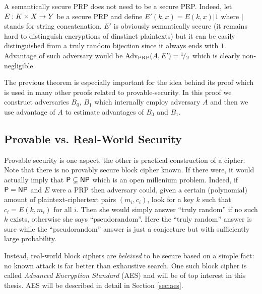 \begin{note}
	A semantically secure PRP does not need to be a secure PRP. Indeed, let $E: K\times X\rightarrow Y$ be a secure PRP and define $E'(k,x) = E(k,x)|1$ where $|$ stands for string concatenation. $E'$ is obviously semantically secure (it remains hard to distinguish encryptions of dinstinct plaintexts) but it can be easily distinguished from a truly random bijection since it always ends with $1$. Advantage of such adversary would be $\operatorname*{Adv_{PRP}}(A,E') = {}^{1}\!/_{2}$ which is clearly non-negligible.
\end{note}

The previous theorem is especially important for the idea behind its proof which is used in many other proofs related to provable-security. In this proof we construct adversaries $B_0$, $B_1$ which internally employ adversary $A$ and then we use advantage of $A$ to estimate advantages of $B_0$ and $B_1$.


\subsection{Provable vs. Real-World Security}

Provable security is one aspect, the other is practical construction of a cipher. Note that there is no provably secure block cipher known. If there were, it would actually imply that $\mathsf{P} \subsetneq \mathsf{NP}$ which is an open millenium problem. Indeed, if $\mathsf{P} = \mathsf{NP}$ and $E$ were a PRP then adversary could, given a certain (polynomial) amount of plaintext-ciphertext pairs $(m_i,c_i)$, look for a key $k$ such that $c_i = E(k,m_i)$ for all $i$. Then she would simply answer ``truly random'' if no such $k$ exists, otherwise she says ``pseudorandom''. Here the ``truly random'' answer is sure while the ``pseudorandom'' answer is just a conjecture but with sufficiently large probability.

Instead, real-world block ciphers are {\em beleived} to be secure based on a simple fact: no known attack is far better than exhaustive search. One such block cipher is called {\em Advanced Encryption Standard} (AES) and will be of top interest in this thesis. AES will be described in detail in Section \ref{sec:aes}.


